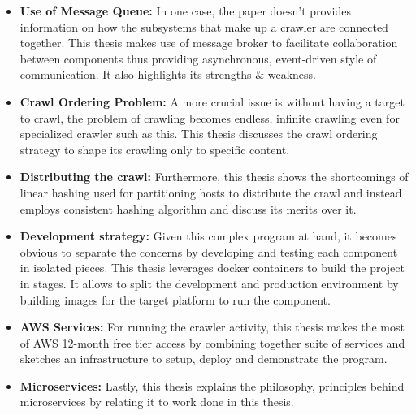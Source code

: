 \begin{itemize}
  \item \textbf{Use of Message Queue:} In one case, the paper doesn't provides information on how the subsystems that make up a crawler are connected together. This thesis makes use of message broker to facilitate collaboration between components thus providing asynchronous, event-driven style of communication. It also highlights its strengths \& weakness.
   \item \textbf{Crawl Ordering Problem:} A more crucial issue is without having a target to crawl, the problem of crawling becomes endless, infinite crawling even for specialized crawler such as this. This thesis discusses the crawl ordering strategy to shape its crawling only to specific content.
   \item \textbf{Distributing the crawl:} Furthermore, this thesis shows the shortcomings of linear hashing used for partitioning hosts to distribute the crawl and instead employs consistent hashing\cite{consisthash} algorithm and discuss its merits over it.
    \item \textbf{Development strategy:}  Given this complex program at hand, it becomes obvious to separate the concerns by developing and testing each component in isolated pieces. This thesis leverages docker containers to build the project in stages. It allows to split the development and production environment by building images for the target platform to run the component.
    \item \textbf{AWS Services:} For running the crawler activity, this thesis makes the most of AWS 12-month free tier access by combining together suite of services and sketches an infrastructure to setup, deploy and demonstrate the program.
    \item \textbf{Microservices:} Lastly, this thesis explains the philosophy, principles behind microservices \cite{microservices} by relating it to work done in this thesis.
\end{itemize}


